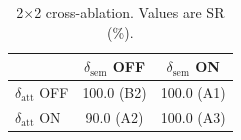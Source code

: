\begin{table}[t]
\centering
\caption{2$\times$2 cross-ablation. Values are SR (\%).}
\label{tab:ablation}
\begin{tabular}{lcc}
\toprule
 & $\delta_{\text{sem}}$ OFF & $\delta_{\text{sem}}$ ON \\
\midrule
$\delta_{\text{att}}$ OFF & 100.0 (B2) & 100.0 (A1) \\
$\delta_{\text{att}}$ ON  & 90.0 (A2) & 100.0 (A3) \\
\bottomrule
\end{tabular}
\end{table}